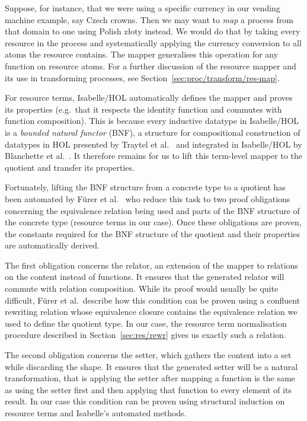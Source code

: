 \documentclass[class=smolathesis,crop=false]{standalone}
\begin{document}
Suppose, for instance, that we were using a specific currency in our vending machine example, say Czech crowns.
Then we may want to \emph{map} a process from that domain to one using Polish z{\l}oty instead.
We would do that by taking every resource in the process and systematically applying the currency conversion to all atoms the resource contains.
The mapper generalises this operation for any function on resource atoms.
For a further discussion of the resource mapper and its use in transforming processes, see Section~\ref{sec:proc/transform/res-map}.

For resource terms, Isabelle/HOL automatically defines the mapper and proves its properties (e.g.\ that it respects the identity function and commutes with function composition).
This is because every inductive datatype in Isabelle/HOL is a \emph{bounded natural functor} (BNF), a structure for compositional construction of datatypes in HOL presented by Traytel et al.~\cite{traytel_et_al-2012} and integrated in Isabelle/HOL by Blanchette et al.~\cite{blanchette_et_al-2014}.
It therefore remains for us to lift this term-level mapper to the quotient and transfer its properties.

Fortunately, lifting the BNF structure from a concrete type to a quotient has been automated by F\"urer et al.~\cite{fuerer_et_al-2020} who reduce this task to two proof obligations concerning the equivalence relation being used and parts of the BNF structure of the concrete type (resource terms in our case).
Once these obligations are proven, the constants required for the BNF structure of the quotient and their properties are automatically derived.

The first obligation concerns the relator, an extension of the mapper to relations on the content instead of functions.
It ensures that the generated relator will commute with relation composition.
While its proof would usually be quite difficult, F\"urer et al.\ describe how this condition can be proven using a confluent rewriting relation whose equivalence closure contains the equivalence relation we used to define the quotient type.
In our case, the resource term normalisation procedure described in Section~\ref{sec:res/rewr} gives us exactly such a relation.

The second obligation concerns the setter, which gathers the content into a set while discarding the shape.
It ensures that the generated setter will be a natural transformation, that is applying the setter after mapping a function is the same as using the setter first and then applying that function to every element of its result.
In our case this condition can be proven using structural induction on resource terms and Isabelle's automated methods.
\end{document}
